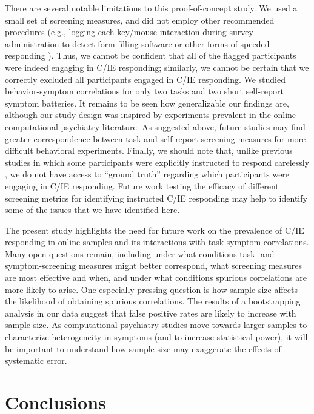 \documentclass[a4paper,notitlepage,12pt]{article}
\begin{document}
\begin{refsection}[main]
There are several notable limitations to this proof-of-concept study. We used a small set of screening measures, and did not employ other recommended procedures (e.g., logging each key/mouse interaction during survey administration to detect form-filling software or other forms of speeded responding \cite{buchanan2018methods}). Thus, we cannot be confident that all of the flagged participants were indeed engaging in C/IE responding; similarly, we cannot be certain that we correctly excluded all participants engaged in C/IE responding. We studied behavior-symptom correlations for only two tasks and two short self-report symptom batteries. It remains to be seen how generalizable our findings are, although our study design was inspired by experiments prevalent in the online computational psychiatry literature. As suggested above, future studies may find greater correspondence between task and self-report screening measures for more difficult behavioral experiments. Finally, we should note that, unlike previous studies in which some participants were explicitly instructed to respond carelessly \cite{buchanan2018methods}, we do not have access to ``ground truth'' regarding which participants were engaging in C/IE responding. Future work testing the efficacy of different screening metrics for identifying instructed C/IE responding may help to identify some of the issues that we have identified here.

The present study highlights the need for future work on the prevalence of C/IE responding in online samples and its interactions with task-symptom correlations. Many open questions remain, including under what conditions task- and symptom-screening measures might better correspond, what screening measures are most effective and when, and under what conditions spurious correlations are more likely to arise. One especially pressing question is how sample size affects the likelihood of obtaining spurious correlations. The results of a bootstrapping analysis in our data suggest that false positive rates are likely to increase with sample size. As computational psychiatry studies move towards larger samples to characterize heterogeneity in symptoms (and to increase statistical power), it will be important to understand how sample size may exaggerate the effects of systematic error. 

\section*{Conclusions}


\end{refsection}
\end{document}
